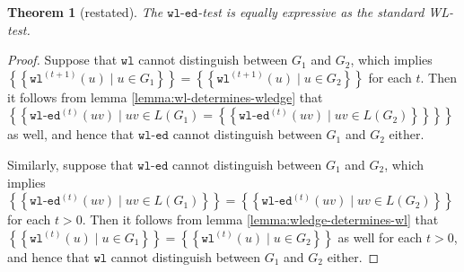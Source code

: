 \documentclass{article}
\newtheorem{theorem}{Theorem}
\newcommand{\multiset}[1]{\left\{\!\!\left\{#1\right\}\!\!\right\}}
\newcommand{\iter}[1]{^{(#1)}}
\newcommand{\wl}{\texttt{wl}}
\newcommand{\wledge}{\texttt{wl-ed}}
\begin{document}
\begingroup
\def\thetheorem{\ref{thm:wledge-equal-to-wl}}
\begin{theorem}[restated]
    The $\wledge$-test is equally expressive as the standard WL-test.
\end{theorem}
\addtocounter{theorem}{-1}
\endgroup

\begin{proof}
    Suppose that $\wl$ cannot distinguish between $G_1$ and $G_2$, which implies $\multiset{\wl\iter{t+1}(u) \mid u\in G_1} = \multiset{\wl\iter{t+1}(u) \mid u\in G_2}$ for each $t$.
    Then it follows from lemma \ref{lemma:wl-determines-wledge} that $\multiset{\wledge\iter{t}(uv) \mid uv\in L(G_1) = \multiset{\wledge\iter{t}(uv) \mid uv\in L(G_2)}}$ as well, and hence that $\wledge$ cannot distinguish between $G_1$ and $G_2$ either.

    Similarly, suppose that $\wledge$ cannot distinguish between $G_1$ and $G_2$, which implies $\multiset{\wledge\iter{t}(uv) \mid uv\in L(G_1)} = \multiset{\wledge\iter{t}(uv) \mid uv\in L(G_2)}$ for each $t>0$.
    Then it follows from lemma \ref{lemma:wledge-determines-wl} that $\multiset{\wl\iter{t}(u) \mid u\in G_1} = \multiset{\wl\iter{t}(u) \mid u\in G_2}$ as well for each $t>0$, and hence that $\wl$ cannot distinguish between $G_1$ and $G_2$ either.
\end{proof}
\end{document}
